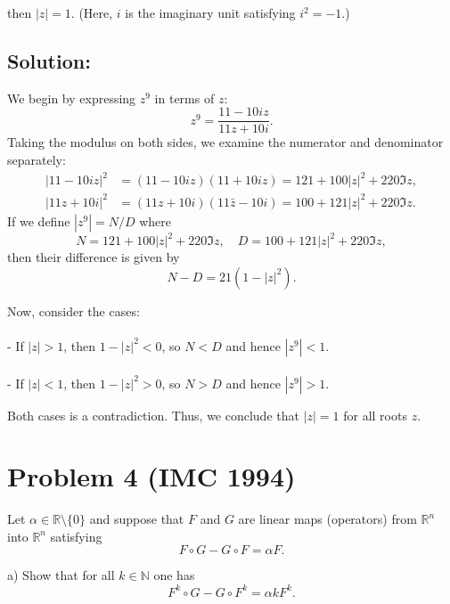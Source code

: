 \documentclass[11pt, a4paper, oneside]{article}
\newcommand{\problem}[1][]{\section{#1} \hfill \par}
\newcommand{\solution}[1][]{\subsection*{#1}\hfill \par}
\theoremstyle{remark}
\theoremstyle{lemma}
\begin{document}
then \( |z| = 1 \). (Here, \( i \) is the imaginary unit satisfying \( i^2 = -1 \).)

\solution[Solution:]

We begin by expressing $z^9$ in terms of $z$:
\begin{equation*}
    z^9 = \frac{11 - 10iz}{11z + 10i}.
\end{equation*}
Taking the modulus on both sides, we examine the numerator and denominator separately:
\begin{align*}
    |11 - 10iz|^2 &= (11 - 10iz)(11 + 10iz) = 121 + 100|z|^2 + 220 \Im z, \\
    |11z + 10i|^2 &= (11z + 10i)(11\bar{z} - 10i) = 100 + 121|z|^2 + 220 \Im z.
\end{align*}
If we define $|z^9| = N/D$ where
\begin{equation*}
    N = 121 + 100|z|^2 + 220 \Im z, \quad D = 100 + 121|z|^2 + 220 \Im z,
\end{equation*}
then their difference is given by
\begin{equation*}
    N - D = 21(1 - |z|^2).
\end{equation*}

Now, consider the cases:
\\\\
- If $|z| > 1$, then $1 - |z|^2 < 0$, so $N < D$ and hence $|z^9| < 1$.
\\\\
- If $|z| < 1$, then $1 - |z|^2 > 0$, so $N > D$ and hence $|z^9| > 1$.

Both cases is a contradiction. Thus, we conclude that $|z| = 1$ for all roots $z$.

\newpage
\problem[Problem 4 (IMC 1994)]
Let \( \alpha \in \mathbb{R} \setminus \{0\} \) and suppose that \( F \) and \( G \) are linear maps (operators) from \( \mathbb{R}^n \) into \( \mathbb{R}^n \) satisfying 
\[
F \circ G - G \circ F = \alpha F.
\]

a) Show that for all \( k \in \mathbb{N} \) one has 
\[
F^k \circ G - G \circ F^k = \alpha k F^k.
\]
\end{document}
